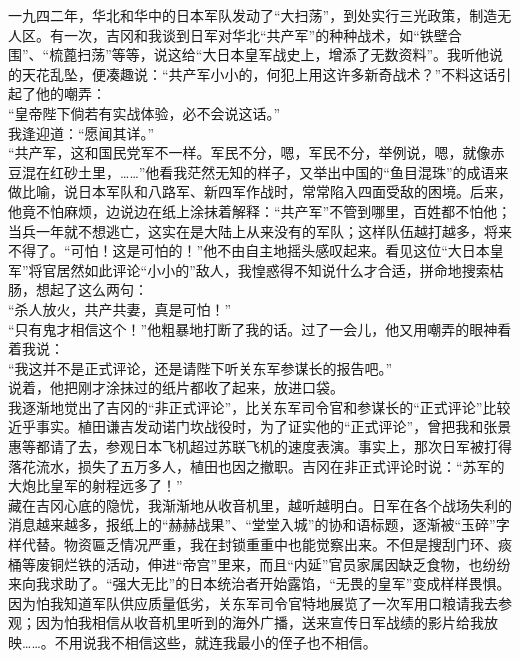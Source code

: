 一九四二年，华北和华中的日本军队发动了“大扫荡”，到处实行三光政策，制造无人区。有一次，吉冈和我谈到日军对华北“共产军”的种种战术，如“铁壁合围”、“梳蓖扫荡”等等，说这给“大日本皇军战史上，增添了无数资料”。我听他说的天花乱坠，便凑趣说：“共产军小小的，何犯上用这许多新奇战术？”不料这话引起了他的嘲弄：\\

“皇帝陛下倘若有实战体验，必不会说这话。”\\

我逢迎道：“愿闻其详。”\\

“共产军，这和国民党军不一样。军民不分，嗯，军民不分，举例说，嗯，就像赤豆混在红砂土里，……”他看我茫然无知的样子，又举出中国的“鱼目混珠”的成语来做比喻，说日本军队和八路军、新四军作战时，常常陷入四面受敌的困境。后来，他竟不怕麻烦，边说边在纸上涂抹着解释：“共产军”不管到哪里，百姓都不怕他；当兵一年就不想逃亡，这实在是大陆上从来没有的军队；这样队伍越打越多，将来不得了。“可怕！这是可怕的！”他不由自主地摇头感叹起来。看见这位“大日本皇军”将官居然如此评论“小小的”敌人，我惶惑得不知说什么才合适，拼命地搜索枯肠，想起了这么两句：\\

“杀人放火，共产共妻，真是可怕！”\\

“只有鬼才相信这个！”他粗暴地打断了我的话。过了一会儿，他又用嘲弄的眼神看着我说：\\

“我这并不是正式评论，还是请陛下听关东军参谋长的报告吧。”\\

说着，他把刚才涂抹过的纸片都收了起来，放进口袋。\\

我逐渐地觉出了吉冈的“非正式评论”，比关东军司令官和参谋长的“正式评论”比较近乎事实。植田谦吉发动诺门坎战役时，为了证实他的“正式评论”，曾把我和张景惠等都请了去，参观日本飞机超过苏联飞机的速度表演。事实上，那次日军被打得落花流水，损失了五万多人，植田也因之撤职。吉冈在非正式评论时说：“苏军的大炮比皇军的射程远多了！”\\

藏在吉冈心底的隐忧，我渐渐地从收音机里，越听越明白。日军在各个战场失利的消息越来越多，报纸上的“赫赫战果”、“堂堂入城”的协和语标题，逐渐被“玉碎”字样代替。物资匾乏情况严重，我在封锁重重中也能觉察出来。不但是搜刮门环、痰桶等废铜烂铁的活动，伸进“帝宫”里来，而且“内延”官员家属因缺乏食物，也纷纷来向我求助了。“强大无比”的日本统治者开始露馅，“无畏的皇军”变成样样畏惧。因为怕我知道军队供应质量低劣，关东军司令官特地展览了一次军用口粮请我去参观；因为怕我相信从收音机里听到的海外广播，送来宣传日军战绩的影片给我放映……。不用说我不相信这些，就连我最小的侄子也不相信。\\


